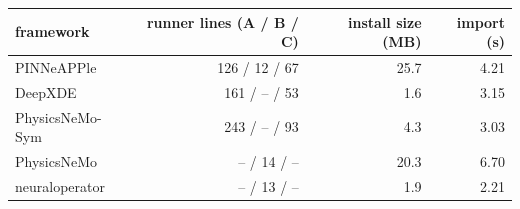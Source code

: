 \begin{tabular}{lrrr}
\toprule
framework & runner lines (A / B / C) & install size (MB) & import (s) \\
\midrule
PINNeAPPle & 126 / 12 / 67 & 25.7 & 4.21 \\
DeepXDE & 161 / -- / 53 & 1.6 & 3.15 \\
PhysicsNeMo-Sym & 243 / -- / 93 & 4.3 & 3.03 \\
PhysicsNeMo & -- / 14 / -- & 20.3 & 6.70 \\
neuraloperator & -- / 13 / -- & 1.9 & 2.21 \\
\bottomrule
\end{tabular}
